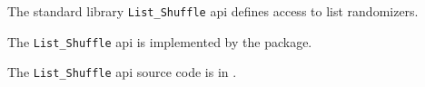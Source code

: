 
The standard library {\tt List\_Shuffle} api defines access to list randomizers.

The {\tt List\_Shuffle} api is implemented by the  package.

The {\tt List\_Shuffle} api source code is in .

